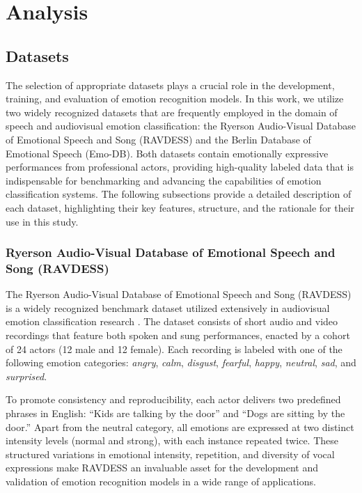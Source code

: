 \chapter{Analysis} \label{chap:analysis}

\section{Datasets}

The selection of appropriate datasets plays a crucial role in the development, training, and evaluation of emotion recognition models. In this work, we utilize two widely recognized datasets that are frequently employed in the domain of speech and audiovisual emotion classification: the Ryerson Audio-Visual Database of Emotional Speech and Song (RAVDESS) and the Berlin Database of Emotional Speech (Emo-DB). Both datasets contain emotionally expressive performances from professional actors, providing high-quality labeled data that is indispensable for benchmarking and advancing the capabilities of emotion classification systems. The following subsections provide a detailed description of each dataset, highlighting their key features, structure, and the rationale for their use in this study.

\subsection{Ryerson Audio-Visual Database of Emotional Speech and Song (RAVDESS)} %

The Ryerson Audio-Visual Database of Emotional Speech and Song (RAVDESS) \cite{ravdess} is a widely recognized benchmark dataset utilized extensively in audiovisual emotion classification research \cite{anusha2021, vimal2021, abdullah2020}. The dataset consists of short audio and video recordings that feature both spoken and sung performances, enacted by a cohort of 24 actors (12 male and 12 female). Each recording is labeled with one of the following emotion categories: \textit{angry}, \textit{calm}, \textit{disgust}, \textit{fearful}, \textit{happy}, \textit{neutral}, \textit{sad}, and \textit{surprised}.

To promote consistency and reproducibility, each actor delivers two predefined phrases in English: ``Kids are talking by the door'' and ``Dogs are sitting by the door.'' Apart from the neutral category, all emotions are expressed at two distinct intensity levels (normal and strong), with each instance repeated twice. These structured variations in emotional intensity, repetition, and diversity of vocal expressions make RAVDESS an invaluable asset for the development and validation of emotion recognition models in a wide range of applications.

